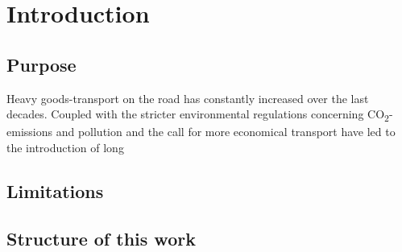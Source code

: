 \documentclass[ExampleMasters.tex]{subfiles}
\begin{document}
\clearpage	
\chapter{Introduction}


\section{Purpose}
Heavy goods-transport on the road has constantly increased over the last decades. Coupled with the stricter environmental regulations concerning CO\textsubscript{2}-emissions and pollution and the call for more economical transport have led to the introduction of long 


\section{Limitations}
\section{Structure of this work}
\end{document}
